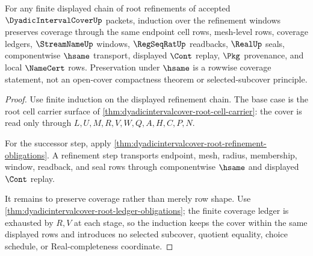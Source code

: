 \begin{theorem}
\label{thm:dyadicintervalcover-root-refinement-coverage}
For any finite displayed chain of root refinements of accepted $\DyadicIntervalCoverUp$ packets, induction over the refinement windows preserves coverage through the same endpoint cell rows, mesh-level rows, coverage ledgers, $\StreamNameUp$ windows, $\RegSeqRatUp$ readbacks, $\RealUp$ seals, componentwise $\hsame$ transport, displayed $\Cont$ replay, $\Pkg$ provenance, and local $\NameCert$ rows. Preservation under $\hsame$ is a rowwise coverage statement, not an open-cover compactness theorem or selected-subcover principle.
\end{theorem}
\begin{proof}
Use finite induction on the displayed refinement chain. The base case is the root cell carrier surface of \autoref{thm:dyadicintervalcover-root-cell-carrier}: the cover is read only through $L,U,M,R,V,W,Q,A,H,C,P,N$.

For the successor step, apply \autoref{thm:dyadicintervalcover-root-refinement-obligations}. A refinement step transports endpoint, mesh, radius, membership, window, readback, and seal rows through componentwise $\hsame$ and displayed $\Cont$ replay.

It remains to preserve coverage rather than merely row shape. Use \autoref{thm:dyadicintervalcover-root-ledger-obligations}; the finite coverage ledger is exhausted by $R,V$ at each stage, so the induction keeps the cover within the same displayed rows and introduces no selected subcover, quotient equality, choice schedule, or Real-completeness coordinate.
\end{proof}

